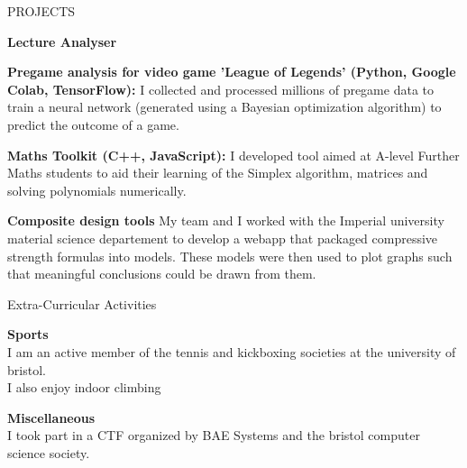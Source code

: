 \documentclass{resume} %
\begin{document}

\begin{rSection}{PROJECTS}
\vspace{-1.25em}

\item \textbf{Lecture Analyser}

\item \textbf{Pregame analysis for video game 'League of Legends' (Python, Google Colab, TensorFlow):}
{I collected and processed millions of pregame data to train a neural network (generated using a Bayesian optimization algorithm) to predict the outcome of a game.}%

\item \textbf{Maths Toolkit (C++, JavaScript):} {I developed tool aimed at A-level Further Maths students to aid their learning of the Simplex algorithm, matrices and solving polynomials numerically.}

\item \textbf{Composite design tools} {My team and I worked with the Imperial university material science departement to develop a webapp that packaged compressive strength formulas into models. These models were then used to plot graphs such that meaningful conclusions could be drawn from them.}

\end{rSection}

\begin{rSection}{Extra-Curricular Activities} 
\vspace{-1.25em}

\item{\textbf{Sports}} \\
I am an active member of the tennis and kickboxing societies at the university of bristol. \\
I also enjoy indoor climbing

\item{\textbf{Miscellaneous}} \\
I took part in a CTF organized by BAE Systems and the bristol computer science society. \\



\end{rSection}
\end{document}
